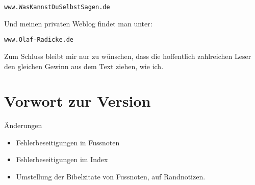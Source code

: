 \begin{center}
\texttt{www.WasKannstDuSelbstSagen.de}
\end{center}

Und meinen privaten Weblog findet man unter:

\begin{center}
\texttt{www.Olaf-Radicke.de}
\end{center}

Zum Schluss bleibt mir nur zu wünschen, dass die hoffentlich zahlreichen Leser
den gleichen Gewinn aus dem Text ziehen, wie ich.


\chapter{Vorwort zur Version \versionsnummer}

Änderungen

\begin{itemize}
 \item Fehlerbeseitigungen in Fussnoten
 \item Fehlerbeseitigungen im Index
 \item Umstellung der Bibelzitate von Fussnoten, auf Randnotizen.
\end{itemize}



